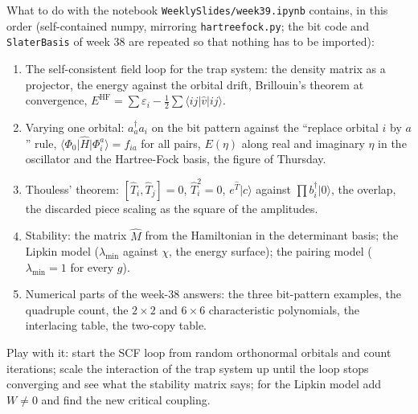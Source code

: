 \documentclass[aspectratio=169,10pt]{beamer}
\newcommand{\ket}[1]{\vert #1\rangle}
\newcommand{\element}[3]{\langle #1\vert #2\vert #3\rangle}
\begin{document}
\begin{frame}{What to do with the notebook}
  \footnotesize
  \texttt{WeeklySlides/week39.ipynb} contains, in this order (self-contained numpy, mirroring \texttt{hartreefock.py}; the bit code and \texttt{SlaterBasis} of week 38 are repeated so that nothing has to be imported):
  \begin{enumerate}
    \item The self-consistent field loop for the trap system: the density matrix as a projector, the energy against the orbital drift, Brillouin's theorem at convergence, $E^{\mathrm{HF}}=\sum\varepsilon_i-\frac12\sum\element{ij}{\hat{v}}{ij}$.
    \item Varying one orbital: $a_a^{\dagger}a_i$ on the bit pattern against the ``replace orbital $i$ by $a$'' rule, $\element{\Phi_0}{\hat{H}}{\Phi_i^a}=f_{ia}$ for all pairs, $E(\eta)$ along real and imaginary $\eta$ in the oscillator and the Hartree-Fock basis, the figure of Thursday.
    \item Thouless' theorem: $[\hat{T}_i,\hat{T}_j]=0$, $\hat{T}_i^2=0$, $e^{\hat{T}}\ket{c}$ against $\prod b_i^{\dagger}\ket{0}$, the overlap, the discarded piece scaling as the square of the amplitudes.
    \item Stability: the matrix $\hat{M}$ from the Hamiltonian in the determinant basis; the Lipkin model ($\lambda_{\min}$ against $\chi$, the energy surface); the pairing model ($\lambda_{\min}=1$ for every $g$).
    \item Numerical parts of the week-38 answers: the three bit-pattern examples, the quadruple count, the $2\times2$ and $6\times6$ characteristic polynomials, the interlacing table, the two-copy table.
  \end{enumerate}
  Play with it: start the SCF loop from random orthonormal orbitals and count iterations; scale the interaction of the trap system up until the loop stops converging and see what the stability matrix says; for the Lipkin model add $W\ne0$ and find the new critical coupling.
\end{frame}
\end{document}
